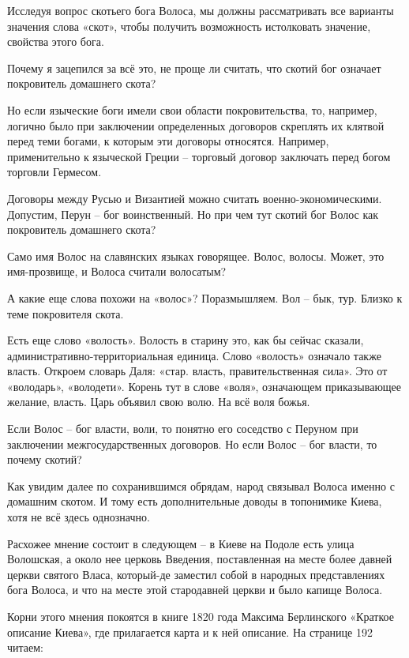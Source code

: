 Исследуя вопрос скотьего бога Волоса, мы должны рассматривать все варианты значения слова «скот», чтобы получить возможность истолковать значение, свойства этого бога.

Почему я зацепился за всё это, не проще ли считать, что скотий бог означает покровитель домашнего скота?

Но если языческие боги имели свои области покровительства, то, например, логично было при заключении определенных договоров скреплять их клятвой перед теми богами, к которым эти договоры относятся. Например, применительно к языческой Греции – торговый договор заключать перед богом торговли Гермесом.

Договоры между Русью и Византией можно считать военно-экономическими. Допустим, Перун – бог воинственный. Но при чем тут скотий бог Волос как покровитель 
домашнего скота?

Само имя Волос на славянских языках говорящее. Волос, волосы. Может, это имя-прозвище, и Волоса считали волосатым?

А какие еще слова похожи на «волос»? Поразмышляем. Вол – бык, тур. Близко к теме покровителя скота.

Есть еще слово «волость». Волость в старину это, как бы сейчас сказали, административно-территориальная единица. Слово «волость» означало также власть. Откроем словарь Даля: «стар. власть, правительственная сила». Это от «володарь», «володети». Корень тут в слове «воля», означающем приказывающее желание, власть. Царь объявил свою волю. На всё воля божья.

Если Волос – бог власти, воли, то понятно его соседство с Перуном при заключении межгосударственных договоров. Но если Волос – бог власти, то почему скотий?

Как увидим далее по сохранившимся обрядам, народ связывал Волоса именно с домашним скотом. И тому есть дополнительные доводы в топонимике Киева, хотя не всё здесь однозначно.

Расхожее мнение состоит в следующем – в Киеве на Подоле есть улица Волошская, а около нее церковь Введения, поставленная на месте более давней церкви святого Власа, который-де заместил собой в народных представлениях бога Волоса, и что на месте этой стародавней церкви и было капище Волоса.

Корни этого мнения покоятся в книге 1820 года Максима Берлинского «Краткое описание Киева», где прилагается карта и к ней описание. На странице 192 читаем:

